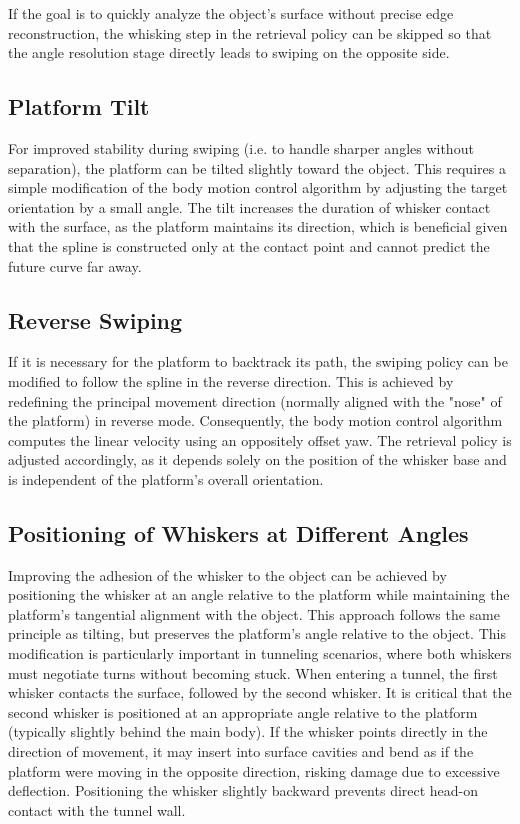 If the goal is to quickly analyze the object's surface without precise edge reconstruction, the whisking step in the retrieval policy can be skipped so that the angle resolution stage directly leads to swiping on the opposite side.

\subsection{Platform Tilt}

For improved stability during swiping (i.e. to handle sharper angles without separation), the platform can be tilted slightly toward the object.
This requires a simple modification of the body motion control algorithm by adjusting the target orientation by a small angle.
The tilt increases the duration of whisker contact with the surface, as the platform maintains its direction, which is beneficial given that the spline is constructed only at the contact point and cannot predict the future curve far away.

\subsection{Reverse Swiping}

If it is necessary for the platform to backtrack its path, the swiping policy can be modified to follow the spline in the reverse direction.
This is achieved by redefining the principal movement direction (normally aligned with the "nose" of the platform) in reverse mode.
Consequently, the body motion control algorithm computes the linear velocity using an oppositely offset yaw.
The retrieval policy is adjusted accordingly, as it depends solely on the position of the whisker base and is independent of the platform's overall orientation.

\subsection{Positioning of Whiskers at Different Angles}

Improving the adhesion of the whisker to the object can be achieved by positioning the whisker at an angle relative to the platform while maintaining the platform's tangential alignment with the object.
This approach follows the same principle as tilting, but preserves the platform's angle relative to the object.
This modification is particularly important in tunneling scenarios, where both whiskers must negotiate turns without becoming stuck.
When entering a tunnel, the first whisker contacts the surface, followed by the second whisker.
It is critical that the second whisker is positioned at an appropriate angle relative to the platform (typically slightly behind the main body).
If the whisker points directly in the direction of movement, it may insert into surface cavities and bend as if the platform were moving in the opposite direction, risking damage due to excessive deflection.
Positioning the whisker slightly backward prevents direct head-on contact with the tunnel wall.

